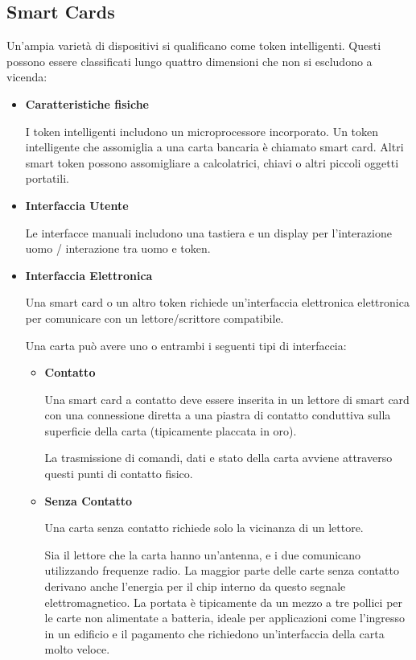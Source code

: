 \newpage
\subsection{Smart Cards}

Un'ampia varietà di dispositivi si qualificano come token intelligenti. Questi possono essere classificati lungo quattro dimensioni che non si escludono a vicenda:

\begin{itemize}
    \item \textbf{Caratteristiche fisiche} 
    
    I token intelligenti includono un microprocessore incorporato. Un token intelligente che assomiglia a una carta bancaria è chiamato smart card. Altri smart token possono assomigliare a calcolatrici, chiavi o altri piccoli oggetti portatili.
    
    \item \textbf{Interfaccia Utente}
    
    Le interfacce manuali includono una tastiera e un display per l'interazione uomo / interazione tra uomo e token.
     
    \item \textbf{Interfaccia Elettronica}
    
    Una smart card o un altro token richiede un'interfaccia elettronica elettronica per comunicare con un lettore/scrittore compatibile.
    
    \singlespacing
    
    Una carta può avere uno o entrambi i seguenti tipi di interfaccia:
    
    \begin{itemize}
        \item \textbf{Contatto}
        
        Una smart card a contatto deve essere inserita in un lettore di smart card con una connessione diretta a una piastra di contatto conduttiva sulla superficie della carta (tipicamente placcata in oro).
        
        La trasmissione di comandi, dati e stato della carta avviene attraverso questi punti di contatto fisico.

        \item \textbf{Senza Contatto}
        
        Una carta senza contatto richiede solo la vicinanza di un lettore.
        
        Sia il lettore che la carta hanno un'antenna, e i due comunicano utilizzando frequenze radio. La maggior parte delle carte senza contatto derivano anche l'energia per il chip interno da questo segnale elettromagnetico. La portata è tipicamente da un mezzo a tre pollici per le carte non alimentate a batteria, ideale per applicazioni come l'ingresso in un edificio e il pagamento che richiedono un'interfaccia della carta molto veloce.
        

\end{itemize}
\end{itemize}
